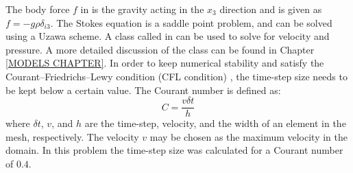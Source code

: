 %
%
%
The body force $f$ in  is the gravity acting in
the $x_{3}$ direction and is given as $f=-g\rho\delta_{i3}$.
The Stokes equation is a saddle point problem, and can be solved using a Uzawa scheme.
A class called  in \escript can be used to solve
for velocity and pressure. A more detailed discussion of the class can be
found in Chapter \ref{MODELS CHAPTER}.
In order to keep numerical stability and satisfy the Courant–Friedrichs–Lewy condition (CFL condition)  , the
time-step size needs to be kept below a certain value.
The Courant number  is defined as:
%
\begin{equation}
C = \frac{v \delta t}{h}
\label{COURANT}
\end{equation}
%
where $\delta t$, $v$, and $h$ are the time-step, velocity, and the width of
an element in the mesh, respectively. The velocity $v$ may be chosen as the
maximum velocity in the domain. In this problem the time-step size was
calculated for a Courant number of $0.4$.

